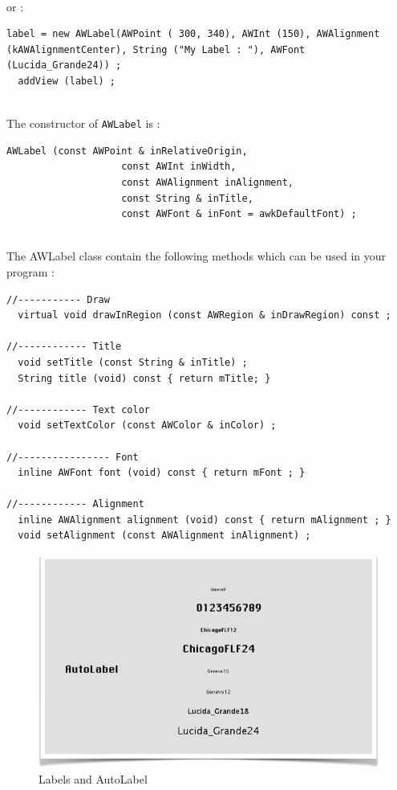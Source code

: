 \documentclass[a4paper,11pt]{extarticle}
\begin{document}
~\\ or :

\begin{lstlisting}[language=Arduinonl]
  label = new AWLabel(AWPoint ( 300, 340), AWInt (150), AWAlignment (kAWAlignmentCenter), String ("My Label : "), AWFont (Lucida_Grande24)) ;
  addView (label) ;
\end{lstlisting}

~\\ The constructor of \texttt{AWLabel} is :

\begin{lstlisting}[language=Arduinonl]
  AWLabel (const AWPoint & inRelativeOrigin,
                    const AWInt inWidth,
                    const AWAlignment inAlignment,
                    const String & inTitle,
                    const AWFont & inFont = awkDefaultFont) ;
\end{lstlisting}

~\\ The AWLabel class contain the following methods which can be used in your program :

\begin{lstlisting}[language=Arduinonl]
//----------- Draw
  virtual void drawInRegion (const AWRegion & inDrawRegion) const ;

//------------ Title
  void setTitle (const String & inTitle) ;
  String title (void) const { return mTitle; }

//------------ Text color
  void setTextColor (const AWColor & inColor) ;

//---------------- Font
  inline AWFont font (void) const { return mFont ; }

//------------ Alignment
  inline AWAlignment alignment (void) const { return mAlignment ; }
  void setAlignment (const AWAlignment inAlignment) ;
\end{lstlisting}

\begin{figure}[htbp]
   \centering
   \includegraphics[scale=0.7]{AWFig9.png} 
   \caption{Labels and AutoLabel}
   \label{fig: 9}
\end{figure}
\end{document}

